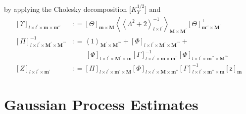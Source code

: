 \documentclass[preprint,12pt]{elsarticle}
\newcommand*{\M}[1]{\ensuremath{#1}\xspace}
\newcommand*{\x}{\times}
\newcommand*{\mi}[1]{\mathbf{#1}}
\newcommand*{\rv}[1]{\mathsf{#1}}
\newcommand*{\te}[2][]{\left\lbrack{#2}\right\rbrack_{#1}}
\newcommand*{\tte}[2][]{\lbrack{#2}\rbrack_{#1}}
\newcommand*{\diag}[2][]{\left\langle{#2}\right\rangle_{#1}}
\newcommand*{\deq}{\M{\mathrel{\mathop:}=}}
\begin{document}
            by applying the Cholesky decomposition $\tte[]{K_{Y}^{1/2}}$ and
            \begin{equation*}
                \begin{aligned}
                    \te[l\x l^{\prime}\x\mi{m}\x\mi{m^{\prime\prime}}]{\Upsilon} &\deq \te[\mi{m}\x\mi{M}]{\Theta}
                    \diag[\mi{M}\x\mi{M^{\prime}}]{\diag[l\x l^{\prime}]{\Lambda^{2}+2}^{-1}} \te[\mi{m^{\prime\prime}}\x\mi{M^{\prime}}]{\Theta}^{\intercal} \\
                    \te[l\x l^{\prime}\x \mi{M^{\prime}}\x\mi{M^{\prime\prime\prime}}]{\Pi}^{-1} &\deq 
                    \diag[\mi{M^{\prime}}\x\mi{M^{\prime\prime\prime}}]{1} + \te[l\x l^{\prime}\x \mi{M^{\prime}}\x\mi{M^{\prime\prime\prime}}]{\Phi} + \\
                    &\phantom{\deq}\ \te[l\x l^{\prime}\x\mi{M^{\prime}\x\mi{m}}]{\Phi}
                    \te[l\x l^{\prime}\x\mi{m}\x\mi{m^{\prime\prime}}]{\Gamma}^{-1} \te[l\x l^{\prime}\x\mi{m^{\prime\prime}}\x\mi{M^{\prime\prime\prime}}]{\Phi} \\
                    \te[l\x l^{\prime}\x \mi{m^{\prime}}]{Z} &\deq 
                    \te[l\x l^{\prime}\x \mi{m^{\prime}}\x\mi{M}]{\Pi}
                    \te[l\x l^{\prime}\x\mi{M}\x\mi{m^{\prime\prime}}]{\Phi}
                    \te[l\x l^{\prime}\x\mi{m^{\prime\prime}}\x\mi{m}]{\Gamma}^{-1}
                    \te[\mi{m}]{\rv{z}}
                \end{aligned}
            \end{equation*}


\section{Gaussian Process Estimates}\label{sec:GPEst}
\end{document}
